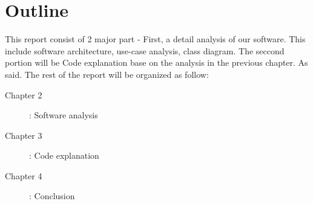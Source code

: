 \section{Outline}
This report consist of 2 major part - First, a detail analysis of our software. This include software architecture, use-case analysis, class diagram.
The seccond portion will be Code explanation base on the analysis in the previous chapter.
As said. The rest of the report will be organized as follow:
\begin{description}
        \item [Chapter 2]: Software analysis
        \item [Chapter 3]: Code explanation
        \item [Chapter 4]: Conclusion
\end{description}
